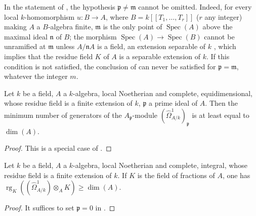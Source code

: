 \begin{remark}[18.11.6]
\label{IV.18.11.6}
In the statement of , the hypothesis $\mathfrak{p}\neq\mathfrak{m}$ cannot be omitted.
Indeed, for every local $k$-homomorphism $u:B\to A$, where $B=k[[T_1,\ldots,T_r]]$ ($r$ any integer) making $A$ a $B$-algebra finite, $\mathfrak{m}$ is the only point of $\operatorname{Spec}(A)$ above the maximal ideal $\mathfrak{n}$ of $B$; the morphism $\operatorname{Spec}(A)\to\operatorname{Spec}(B)$ cannot be unramified at $\mathfrak{m}$ unless $A/\mathfrak{n}A$ is a field, an extension separable of $k$ , which implies that the residue field $K$ of $A$ is a separable extension of $k$.
If this condition is not satisfied, the conclusion of  can never be satisfied for $\mathfrak{p}=\mathfrak{m}$, whatever the integer $m$.
\end{remark}

\begin{corollary}[18.11.7]
\label{IV.18.11.7}
Let $k$ be a field, $A$ a $k$-algebra, local Noetherian and complete, equidimensional, whose residue field is a finite extension of $k$, $\mathfrak{p}$ a prime ideal of $A$.
Then the minimum number of generators of the $A_\mathfrak{p}$-module $(\hat{\Omega}^1_{A/k})_\mathfrak{p}$ is at least equal to $\dim(A)$.
\end{corollary}

\begin{proof}
This is a special case of .
\end{proof}


\begin{corollary}[18.11.8]
\label{IV.18.11.8}
Let $k$ be a field, $A$ a $k$-algebra, local Noetherian and complete, \textup{integral}, whose residue field is a finite extension of $k$.
If $K$ is the field of fractions of $A$, one has $\operatorname{rg}_{K}((\hat{\Omega}^1_{A/k})\otimes_{A}K)\geq\dim(A)$.
\end{corollary}

\begin{proof}
It suffices to set $\mathfrak{p}=0$ in .
\end{proof}

